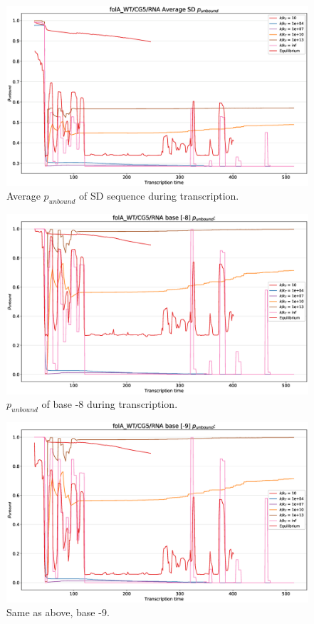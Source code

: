 \documentclass[11pt, a4paper]{article}
\begin{document}
\begin{figure}
	\centering
	\includegraphics[width=\linewidth]{p_unbound/RNA_p_unbound_SD_k_tuning}
	\caption{Average $p_{unbound}$ of SD sequence during transcription.}
	\label{fig:RNA_p_unbound_SD_k_tuning}
\end{figure}
\begin{figure}
\centering
\includegraphics[width=\linewidth]{p_unbound/RNA_p_unbound_base[-8]_k_tuning}
\caption{$p_{unbound}$ of base -8 during transcription.}
\label{fig:RNA_p_unbound_base[-8]_k_tuning}
\end{figure}
\begin{figure}
\centering
\includegraphics[width=\linewidth]{p_unbound/RNA_p_unbound_base[-9]_k_tuning}
\caption{Same as above, base -9.}
\label{fig:RNA_p_unbound_base[-9]_k_tuning}
\end{figure}
\end{document}
